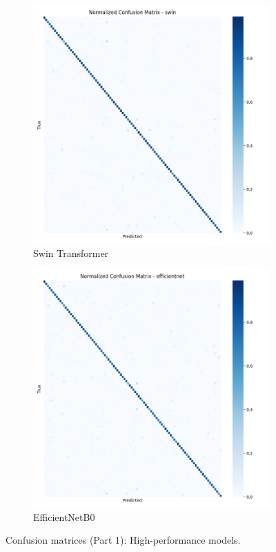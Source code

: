 \documentclass[11pt]{article}
\begin{document}
\begin{figure}[htbp]
\vspace{0.2cm} %

\begin{subfigure}[b]{0.48\textwidth}
\includegraphics[width=\textwidth]{confusion_matrix_swin_full.png}
\caption{Swin Transformer}
\end{subfigure}
\hfill
\begin{subfigure}[b]{0.48\textwidth}
\includegraphics[width=\textwidth]{confusion_matrix_efficientnetb0_full.png}
\caption{EfficientNetB0}
\end{subfigure}

\caption{Confusion matrices (Part 1): High-performance models.}
\label{fig:confusion_part1}
\end{figure}
\end{document}
